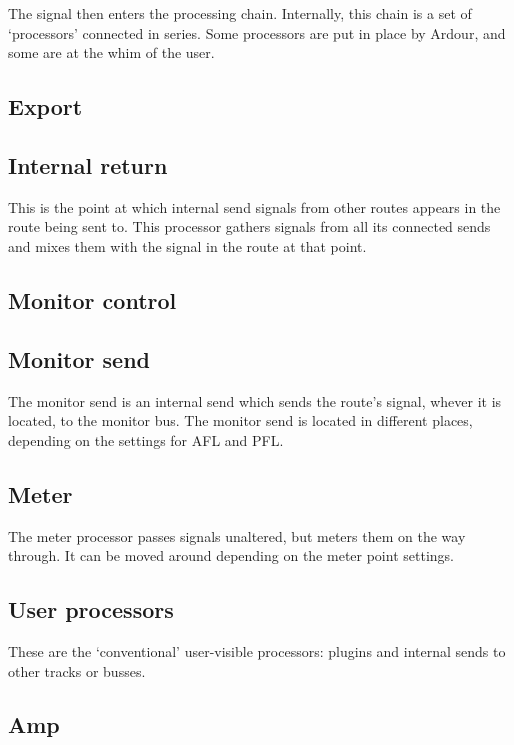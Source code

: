 \documentclass[10pt,a4paper]{book}
\begin{document}
{The signal then enters the processing chain.  Internally, this chain
is a set of `processors' connected in series.  Some processors are put
in place by Ardour, and some are at the whim of the user.

\subsection{Export}


\subsection{Internal return}

This is the point at which internal send signals from other routes
appears in the route being sent to.  This processor gathers signals
from all its connected sends and mixes them with the signal in the
route at that point.

\subsection{Monitor control}


\subsection{Monitor send}

The monitor send is an internal send which sends the route's signal,
whever it is located, to the monitor bus.  The monitor send is located
in different places, depending on the settings for AFL and PFL\@.

\subsection{Meter}

The meter processor passes signals unaltered, but meters them on the
way through.  It can be moved around depending on the meter point settings.

\subsection{User processors}

These are the `conventional' user-visible processors: plugins and
internal sends to other tracks or busses.

\subsection{Amp}

}
\end{document}

